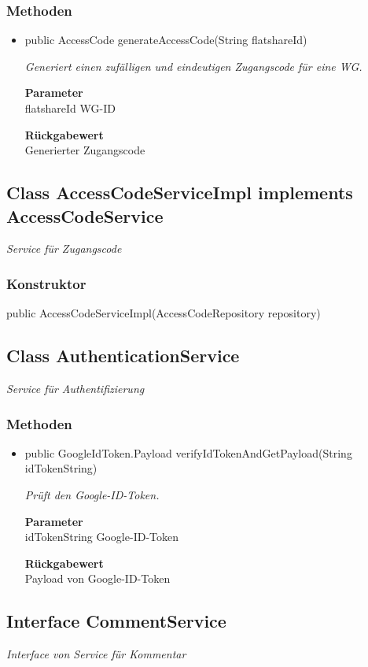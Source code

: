 \documentclass[a4paper]{scrreprt}
\begin{document}
    \subsubsection{Methoden}
    \begin{itemize}
    	\item{public AccessCode generateAccessCode(String flatshareId)}
    	
    	\textit{Generiert einen zufälligen und eindeutigen Zugangscode für eine WG.}
    	
    	\textbf{Parameter} \\
    	flatshareId WG-ID
    	
    	\textbf{Rückgabewert} \\
    	Generierter Zugangscode
    \end{itemize}
    \subsection{Class AccessCodeServiceImpl implements AccessCodeService}
    \textit{Service für Zugangscode}
    \subsubsection{Konstruktor}
    public AccessCodeServiceImpl(AccessCodeRepository repository)
    \subsection{Class AuthenticationService}
    \textit{Service für Authentifizierung}
    \subsubsection{Methoden}
    \begin{itemize}
    	\item{public GoogleIdToken.Payload verifyIdTokenAndGetPayload(String idTokenString)}
    	
    	\textit{Prüft den Google-ID-Token.}
    	
    	\textbf{Parameter} \\
    	idTokenString Google-ID-Token
    	
    	\textbf{Rückgabewert} \\
    	Payload von Google-ID-Token
    \end{itemize}
    \subsection{Interface CommentService}
    \textit{Interface von Service für Kommentar}
\end{document}
